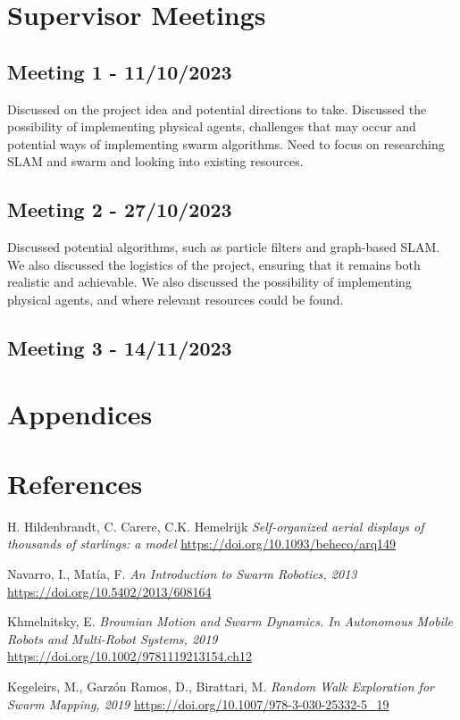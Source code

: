 \documentclass[12pt]{article}
\begin{document}
\section{Supervisor Meetings}
\subsection{Meeting 1 - 11/10/2023}
Discussed on the project idea and potential directions to take. Discussed the possibility of implementing physical agents,
challenges that may occur and potential ways of implementing swarm algorithms. Need to focus on researching SLAM and swarm
and looking into existing resources.
\subsection{Meeting 2 - 27/10/2023}
Discussed potential algorithms, such as particle filters and graph-based SLAM. We also discussed the logistics of the project,
ensuring that it remains both realistic and achievable. We also discussed the possibility of implementing physical agents,
and where relevant resources could be found.
\subsection{Meeting 3 - 14/11/2023}

\section{Appendices}

\section{References}

\begin{thebibliography}{9}

    H. Hildenbrandt, C. Carere, C.K. Hemelrijk
    \textit{Self-organized aerial displays of thousands of starlings: a model}
    \href{https://doi.org/10.1093/beheco/arq149}{https://doi.org/10.1093/beheco/arq149}

    Navarro, I., Matía, F.
    \textit{An Introduction to Swarm Robotics, 2013}
    \href{https://doi.org/10.5402/2013/608164}{https://doi.org/10.5402/2013/608164}

    Khmelnitsky, E.
    \textit{Brownian Motion and Swarm Dynamics. In Autonomous Mobile Robots and Multi-Robot Systems, 2019}
    \href{https://doi.org/10.1002/9781119213154.ch12}{https://doi.org/10.1002/9781119213154.ch12}

    Kegeleirs, M., Garzón Ramos, D., Birattari, M.
    \textit{Random Walk Exploration for Swarm Mapping, 2019}
    \href{https://doi.org/10.1007/978-3-030-25332-5_19}{https://doi.org/10.1007/978-3-030-25332-5_19}

\end{thebibliography}
\end{document}
